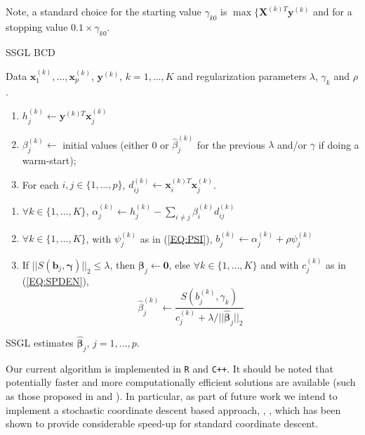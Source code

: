 \documentclass{article}
\numberwithin{equation}{section}
\theoremstyle{plain}
\newcommand{\bs}{\boldsymbol}
\begin{document}
Note, a standard choice for the starting value $\gamma_{k0}$ is
$\max\{\mathbf{X}^{(k)T}\mathbf{y}^{(k)}$ and for a stopping value $0.1 \times
\gamma_{k0}$.

\begin{algorithm}[tb]
   \caption{SSGL BCD}
   \label{ALG:BCD}
\begin{algorithmic}
    Data
   $\mathbf{x}^{(k)}_1,\ldots,\mathbf{x}^{(k)}_p$, $\mathbf{y}^{(k)}$, $k =
   1,\ldots,K$ and regularization parameters $\lambda$, $\gamma_k$ and $\rho$.
   \begin{enumerate}
\item $h_j^{(k)} \leftarrow \mathbf{y}^{(k)T} \mathbf{x}^{(k)}_j$ 
\item $\beta_j^{(k)} \leftarrow$ initial values (either 0 or
$\hat{\beta}_j^{(k)}$ for the previous $\lambda$ and/or $\gamma$ if doing a
warm-start);
\item For each $i,j \in \{1,\ldots,p\}$, $d_{ij}^{(k)} \leftarrow
\mathbf{x}_i^{(k)T} \mathbf{x}_j^{(k)}$.
\end{enumerate}
   \begin{enumerate}
  \item $\forall k \in \{1, \ldots, K \}$, 
  $\alpha_j^{(k)} \leftarrow h_j^{(k)} - \sum_{i \neq j} \beta_i^{(k)}
  d_{ij}^{(k)}$
  \item $\forall k \in \{1, \ldots, K \}$, with $\psi_j^{(k)}$ as in
  (\ref{EQ:PSI}), $b_j^{(k)} \leftarrow \alpha_j^{(k)} + \rho \psi_j^{(k)}$  
  \item If $||S(\mathbf{b}_j, \bs\gamma)||_2 \leq \lambda$, then $\bs\beta_j
  \leftarrow \mathbf{0}$, else
 $\forall k \in \{1, \ldots, K \}$ and with $c_j^{(k)}$ as in (\ref{EQ:SPDEN}), 
 $$\hat{\beta}_j^{(k)} \leftarrow 
 \frac{S(b_j^{(k)}, \gamma_k)}{c_j^{(k)} + \lambda/||\hat{\bs\beta}_j||_2}$$
\end{enumerate}
    SSGL estimates $\hat{\bs\beta}_j$, $j =
   1,\ldots,p$.
\end{algorithmic}
\end{algorithm}


Our current algorithm is implemented in {\tt R} and {\tt C++}. It should be
noted that potentially faster and more computationally efficient solutions are
available (such as those proposed in  \cite{vogt2012} and \cite{simon2013}). In
particular, as part of future work we intend to implement a stochastic
coordinate descent based approach, \cite{shwartz2011}, \cite{liu2014}, which has
been shown to provide considerable speed-up for standard coordinate descent.
\end{document}
